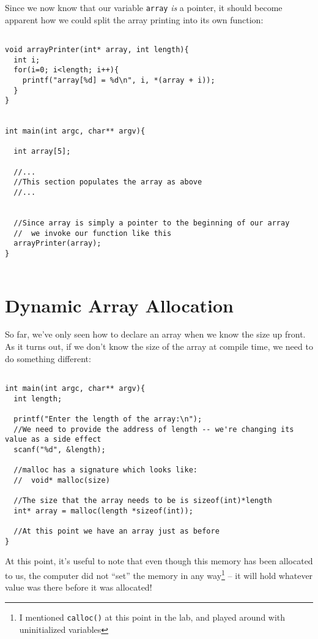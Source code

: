 \documentclass[10pt]{article}
\begin{document}
Since we now know that our variable \texttt{array} \textit{is} a pointer, it should become apparent how we could split the array printing into its own function:

\begin{lstlisting}

void arrayPrinter(int* array, int length){
  int i;
  for(i=0; i<length; i++){
    printf("array[%d] = %d\n", i, *(array + i));
  }
}


int main(int argc, char** argv){

  int array[5];

  //...
  //This section populates the array as above
  //...


  //Since array is simply a pointer to the beginning of our array
  //  we invoke our function like this
  arrayPrinter(array);
}


\end{lstlisting}


\section*{Dynamic Array Allocation}

So far, we've only seen how to declare an array when we know the size up front. As it turns out, if we don't know the size of the array at compile time, we need to do something different:

\begin{lstlisting}

int main(int argc, char** argv){
  int length;

  printf("Enter the length of the array:\n");
  //We need to provide the address of length -- we're changing its value as a side effect
  scanf("%d", &length);

  //malloc has a signature which looks like:
  //  void* malloc(size)

  //The size that the array needs to be is sizeof(int)*length
  int* array = malloc(length *sizeof(int));

  //At this point we have an array just as before
}

\end{lstlisting}

\noindent At this point, it's useful to note that even though this memory has been allocated to us, the computer did not ``set'' the memory in any way\footnote{I mentioned \texttt{calloc()} at this point in the lab, and played around with uninitialized variables} -- it will hold whatever value was there before it was allocated!
\end{document}
